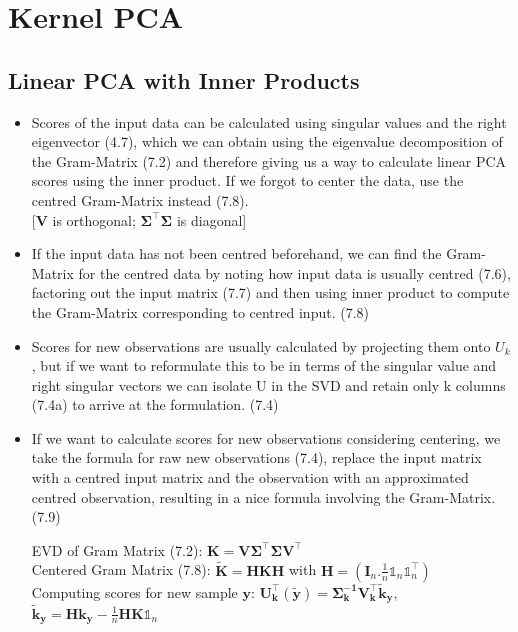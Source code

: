 \documentclass[english]{latex4ei/latex4ei_sheet}
\begin{document}
\vspace{300}
\section{Kernel PCA}
\begin{sectionbox}
\subsection{Linear PCA with Inner Products}
\begin{itemize}
\item Scores of the input data can be calculated using singular values and the right eigenvector (4.7), which we can obtain using the eigenvalue decomposition of the Gram-Matrix (7.2) and therefore giving us a way to calculate linear PCA scores using the inner product. If we forgot to center the data, use the centred Gram-Matrix instead (7.8).\\
\hspace{5}[$\mathbf{V}$ is orthogonal; $\mathbf{\Sigma}^{\top}\mathbf{\Sigma}$ is diagonal]
\item If the input data has not been centred beforehand, we can find the Gram-Matrix for the centred data by noting how input data is usually centred (7.6), factoring out the input matrix (7.7) and then using inner product to compute the Gram-Matrix  corresponding to centred input. (7.8)
\item Scores for new observations are usually calculated by projecting them onto $U_k$, but if we want to reformulate this to be in terms of the singular value and right singular vectors we can isolate U in the SVD and retain only k columns (7.4a) to arrive at the formulation. (7.4)
\item If we want to calculate scores for new observations considering centering, we take the formula for raw new observations (7.4), replace the input matrix with a centred input matrix and the observation with an approximated centred observation, resulting in a nice formula involving the Gram-Matrix. (7.9)
\begin{emphbox}
    EVD of Gram Matrix (7.2): $\mathbf{K=V\Sigma^{\top}\Sigma V^{\top}}$\\
    Centered Gram Matrix (7.8): $\mathbf{\tilde{K}=HKH}$ with $\mathbf{H}=(\mathbf{I}_n.\frac{1}{n}\mathds{1}_n\mathds{1}_n^{\top})$\\
    Computing scores for new sample $\mathbf{y}$:
    $\mathbf{U_k^{\top}}(\mathbf{\tilde{y}})=\mathbf{\Sigma_k^{-1}V_k^{\top}\tilde{k}_y}$, \quad $\mathbf{\tilde{k}_y=Hk_y-}\frac{1}{n}\mathbf{HK}\mathds{1}_n$

\end{emphbox}
\end{itemize}
\end{sectionbox}
\end{document}
